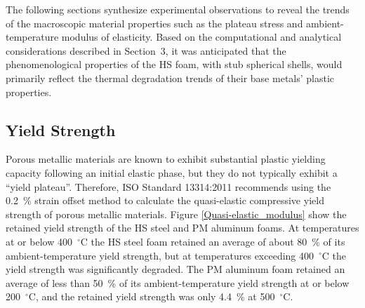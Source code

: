 \documentclass[review]{elsarticle}
\begin{document}
The following sections synthesize experimental observations to reveal the trends of the macroscopic material properties such as the plateau stress and ambient-temperature modulus of elasticity. Based on the computational and analytical considerations described in Section~3, it was anticipated that the phenomenological properties of the HS foam, with stub spherical shells, would primarily reflect the thermal degradation trends of their base metals' plastic properties.

\subsection{Yield Strength}

Porous metallic materials are known to exhibit substantial plastic yielding capacity following an initial elastic phase, but they do not typically exhibit a ``yield plateau''. Therefore, ISO Standard 13314:2011 recommends using the 0.2~\% strain offset method to calculate the quasi-elastic compressive yield strength of porous metallic materials. Figure \ref{Quasi-elastic_modulus} show the retained yield strength of the HS steel and PM aluminum foams. At temperatures at or below 400~$^{\circ}\mathrm{C}$ the HS steel foam retained an average of about 80~\% of its ambient-temperature yield strength, but at temperatures exceeding 400~$^{\circ}\mathrm{C}$ the yield strength was significantly degraded. The PM aluminum foam retained an average of less than 50~\% of its ambient-temperature yield strength at or below 200~$^{\circ}\mathrm{C}$, and the retained yield strength was only 4.4~\% at 500~$^{\circ}\mathrm{C}$.
\end{document}
